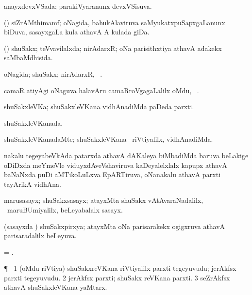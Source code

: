 \bentry
{} 
\gl{\gu} 
\bmng
anayxdevxVSada; parakiVyaranunx devxVSisuva.
\emng
\eentry

\bentry
{} 
\gl{\nA} 
\bmng
(\savi) siZrAMthimamf; oNagida,  bahukAlaviruva saMyukatxpuSapxgaLanunx biDuva, sasayxgaLa kula athavA A  kulada giDa.
\emng  
\eentry

\bentry
{} 
\gl{\gu}  
\bmng
(\pari) shuSakx; teVvavilalxda;  nirAdarxR; oNa parisithxtiya athavA adakekx saMbaMdhisida.
\emng 
\eentry

\bentry
{}  
\gl{\sapUpa}
\bmng
oNagida; shuSakx; nirAdarxR, \udA\ .
\emng
\eentry

\bentry
{} 
\gl{\nA} 
\bmng
camaR atiyAgi oNaguva halavAru camaRroVgagaLalilx oMdu, \kanmu\ .
\emng  
\eentry

\bentry
{}
\gl{\nA}
\bmng
shuSakxleVKa; shuSakxleVKana vidhAnadiMda paDeda parxti.
\emng 
\eentry

\bentry
{} 
\gl{\gu} 
\bmng
shuSakxleVKanada.
\emng
\eentry

\bentry 
{} 
\gl{\kirxvi} 
\bmng
shuSakxleVKanadaMte; shuSakxleVKana\,--\,riVtiyalilx, vidhAnadiMda.
\emng 
\eentry

\bentry
{} 
\gl{\nA} 
\bmng
nakalu tegeyabeVkAda patarxda athavA dAKaleya biMbadiMda  baruva beLakige oDiDxda meYmeVle viduyxdAveVshaviruva kaDeyalelxlalx kapupx athavA baNaNxda puDi aMTikoLuLxva EpARTiruva, oNanakalu athavA parxti tayArikA vidhAna.
\emng 
\eentry

\bentry
{} 
\gl{\nA} 
\bmng
marusasayx; shuSakxsasayx;  atayxMta shuSakx vAtAvaraNadalilx, \kanmu\ maruBUmiyalilx, beLeyabalalx sasayx.
\emng
\eentry

\bentry 
{} 
\gl{\gu} 
\bmng
(sasayxda \vi)  shuSakxpirxya; atayxMta oNa parisarakekx ogigxruva athavA parisaradalilx beLeyuva.
\emng 
\eentry

\bentry
{} 
\gl{\nA} 
\bmng
= .
\emng
\eentry

\bentry
{} 
\gl{\nA} 
\bmng
\P\ 
\bnum
\num{1} (oMdu riVtiya) shuSakxreVKana  riVtiyalilx parxti tegeyuvudu; jerAkfsx parxti tegeyuvudu.
\num{2} jerAkfsx parxti; shuSakx reVKana parxti.  
\num{3} seZrAkfsx  athavA shuSakxleVKana yaMtarx.
\enum
\emng
\eentry

